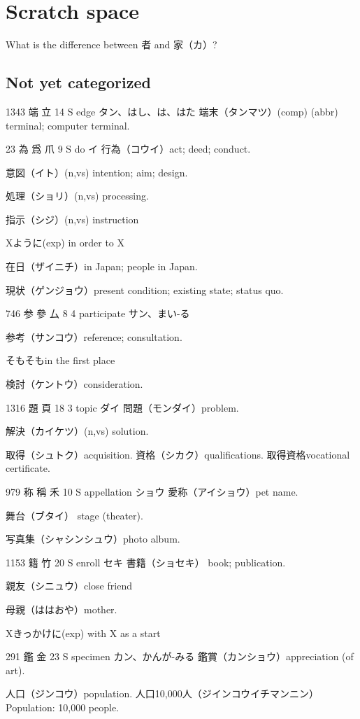 \chapter{Scratch space}

What is the difference between 者 and 家（カ）?

\section{Not yet categorized}

1343	端		立	14	S		edge	タン、はし、は、はた
端末（タンマツ）(comp) (abbr) terminal; computer terminal.

23	為	爲	爪	9	S		do	イ
行為（コウイ）act; deed; conduct.

意図（イト）(n,vs) intention; aim; design.

処理（ショリ）(n,vs) processing.

指示（シジ）(n,vs) instruction

Xように(exp) in order to X

在日（ザイニチ）in Japan; people in Japan.

現状（ゲンジョウ）present condition; existing state; status quo.

746	参	參	厶	8	4		participate	サン、まい-る

参考（サンコウ）reference; consultation.

そもそもin the first place

検討（ケントウ）consideration.

1316	題		頁	18	3		topic	ダイ
問題（モンダイ）problem.

解決（カイケツ）(n,vs) solution.

取得（シュトク）acquisition.
資格（シカク）qualifications.
取得資格vocational certificate.

979	称	稱	禾	10	S		appellation	ショウ
愛称（アイショウ）pet name.

舞台（ブタイ）
stage (theater).

写真集（シャシンシュウ）photo album.

1153	籍		竹	20	S		enroll	セキ
書籍（ショセキ）
book; publication.

親友（シニュウ）close friend

母親（ははおや）mother.

Xきっかけに(exp) with X as a start

291	鑑		金	23	S		specimen	カン、かんが-みる
鑑賞（カンショウ）appreciation (of art).

人口（ジンコウ）population.
人口10,000人（ジインコウイチマンニン）
Population: 10,000 people.

